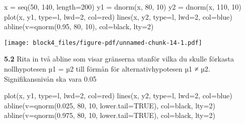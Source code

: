 \documentclass[
  letterpaper,
  DIV=11,
  numbers=noendperiod]{scrartcl}
\newenvironment{Shaded}{\begin{snugshade}}{\end{snugshade}}
\newcommand{\AttributeTok}[1]{\textcolor[rgb]{0.40,0.45,0.13}{#1}}
\newcommand{\ConstantTok}[1]{\textcolor[rgb]{0.56,0.35,0.01}{#1}}
\newcommand{\DecValTok}[1]{\textcolor[rgb]{0.68,0.00,0.00}{#1}}
\newcommand{\FloatTok}[1]{\textcolor[rgb]{0.68,0.00,0.00}{#1}}
\newcommand{\FunctionTok}[1]{\textcolor[rgb]{0.28,0.35,0.67}{#1}}
\newcommand{\NormalTok}[1]{\textcolor[rgb]{0.00,0.23,0.31}{#1}}
\newcommand{\OtherTok}[1]{\textcolor[rgb]{0.00,0.23,0.31}{#1}}
\newcommand{\StringTok}[1]{\textcolor[rgb]{0.13,0.47,0.30}{#1}}
\begin{document}
\begin{Shaded}
\begin{Highlighting}[]
\NormalTok{x }\OtherTok{=} \FunctionTok{seq}\NormalTok{(}\DecValTok{50}\NormalTok{, }\DecValTok{140}\NormalTok{, }\AttributeTok{length=}\DecValTok{200}\NormalTok{)}
\NormalTok{y1 }\OtherTok{=} \FunctionTok{dnorm}\NormalTok{(x, }\DecValTok{80}\NormalTok{, }\DecValTok{10}\NormalTok{)}
\NormalTok{y2 }\OtherTok{=} \FunctionTok{dnorm}\NormalTok{(x, }\DecValTok{110}\NormalTok{, }\DecValTok{10}\NormalTok{)}
\FunctionTok{plot}\NormalTok{(x, y1, }\AttributeTok{type=}\StringTok{\textquotesingle{}l\textquotesingle{}}\NormalTok{, }\AttributeTok{lwd=}\DecValTok{2}\NormalTok{, }\AttributeTok{col=}\StringTok{\textquotesingle{}red\textquotesingle{}}\NormalTok{)}
\FunctionTok{lines}\NormalTok{(x, y2, }\AttributeTok{type=}\StringTok{\textquotesingle{}l\textquotesingle{}}\NormalTok{, }\AttributeTok{lwd=}\DecValTok{2}\NormalTok{, }\AttributeTok{col=}\StringTok{\textquotesingle{}blue\textquotesingle{}}\NormalTok{)}
\FunctionTok{abline}\NormalTok{(}\AttributeTok{v=}\FunctionTok{qnorm}\NormalTok{(}\FloatTok{0.95}\NormalTok{, }\DecValTok{80}\NormalTok{, }\DecValTok{10}\NormalTok{), }\AttributeTok{col=}\StringTok{\textquotesingle{}black\textquotesingle{}}\NormalTok{, }\AttributeTok{lty=}\DecValTok{2}\NormalTok{)}
\end{Highlighting}
\end{Shaded}

\texttt{[image: block4\_files/figure-pdf/unnamed-chunk-14-1.pdf]}

\textbf{5.2} Rita in två abline som visar gränserna utanför vilka du
skulle förkasta nollhypotesen µ1 = µ2 till förmån för
alternativhypotesen µ1 ≠ µ2. Signifikansnivån ska vara 0.05

\begin{Shaded}
\begin{Highlighting}[]
\FunctionTok{plot}\NormalTok{(x, y1, }\AttributeTok{type=}\StringTok{\textquotesingle{}l\textquotesingle{}}\NormalTok{, }\AttributeTok{lwd=}\DecValTok{2}\NormalTok{, }\AttributeTok{col=}\StringTok{\textquotesingle{}red\textquotesingle{}}\NormalTok{)}
\FunctionTok{lines}\NormalTok{(x, y2, }\AttributeTok{type=}\StringTok{\textquotesingle{}l\textquotesingle{}}\NormalTok{, }\AttributeTok{lwd=}\DecValTok{2}\NormalTok{, }\AttributeTok{col=}\StringTok{\textquotesingle{}blue\textquotesingle{}}\NormalTok{)}
\FunctionTok{abline}\NormalTok{(}\AttributeTok{v=}\FunctionTok{qnorm}\NormalTok{(}\FloatTok{0.025}\NormalTok{, }\DecValTok{80}\NormalTok{, }\DecValTok{10}\NormalTok{, }\AttributeTok{lower.tail=}\ConstantTok{TRUE}\NormalTok{), }\AttributeTok{col=}\StringTok{\textquotesingle{}black\textquotesingle{}}\NormalTok{, }\AttributeTok{lty=}\DecValTok{2}\NormalTok{)}
\FunctionTok{abline}\NormalTok{(}\AttributeTok{v=}\FunctionTok{qnorm}\NormalTok{(}\FloatTok{0.975}\NormalTok{, }\DecValTok{80}\NormalTok{, }\DecValTok{10}\NormalTok{, }\AttributeTok{lower.tail=}\ConstantTok{TRUE}\NormalTok{), }\AttributeTok{col=}\StringTok{\textquotesingle{}black\textquotesingle{}}\NormalTok{, }\AttributeTok{lty=}\DecValTok{2}\NormalTok{)}
\end{Highlighting}
\end{Shaded}
\end{document}

